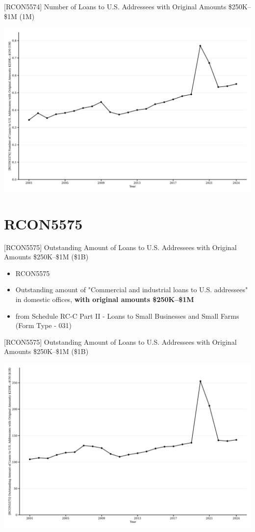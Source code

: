 \documentclass{beamer}
\begin{document}
\begin{frame}{[RCON5574] Number of Loans to U.S. Addressees with Original Amounts \$250K–\$1M (1M)}
\begin{center}
\includegraphics[width=1\textwidth]{figures/Figure_RCON5574_Num_Loans_250K_1M.pdf}
\end{center}
\end{frame}


\section{RCON5575}
\begin{frame}{[RCON5575] Outstanding Amount of Loans to U.S. Addressees with Original Amounts \$250K–\$1M (\$1B)}
\begin{itemize}
    \item RCON5575
    \item Outstanding amount of "Commercial and industrial loans to U.S. addressees" in domestic offices, \textbf{with original amounts \$250K–\$1M}
    \item from Schedule RC-C Part II - Loans to Small Businesses and Small Farms (Form Type - 031)
\end{itemize}
\end{frame}

\begin{frame}{[RCON5575] Outstanding Amount of Loans to U.S. Addressees with Original Amounts \$250K–\$1M (\$1B)}
\begin{center}
\includegraphics[width=1\textwidth]{figures/Figure_RCON5575_Outstanding_250K_1M.pdf}
\end{center}
\end{frame}
\end{document}
